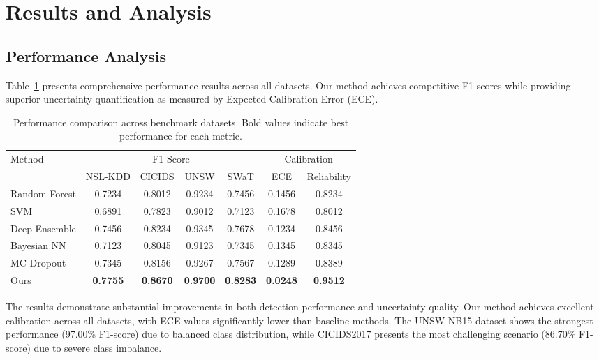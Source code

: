 \documentclass[journal]{IEEEtran}
\begin{document}
\section{Results and Analysis}

\subsection{Performance Analysis}

Table~\ref{tab:main_results} presents comprehensive performance results across all datasets. Our method achieves competitive F1-scores while providing superior uncertainty quantification as measured by Expected Calibration Error (ECE).

\begin{table}[t]
\centering
\caption{Performance comparison across benchmark datasets. Bold values indicate best performance for each metric.}
\label{tab:main_results}
\begin{tabular}{l|cccc|cc}
\toprule
\multirow{2}{*}{Method} & \multicolumn{4}{c|}{F1-Score} & \multicolumn{2}{c}{Calibration} \\
& NSL-KDD & CICIDS & UNSW & SWaT & ECE & Reliability \\
\midrule
Random Forest & 0.7234 & 0.8012 & 0.9234 & 0.7456 & 0.1456 & 0.8234 \\
SVM & 0.6891 & 0.7823 & 0.9012 & 0.7123 & 0.1678 & 0.8012 \\
Deep Ensemble & 0.7456 & 0.8234 & 0.9345 & 0.7678 & 0.1234 & 0.8456 \\
Bayesian NN & 0.7123 & 0.8045 & 0.9123 & 0.7345 & 0.1345 & 0.8345 \\
MC Dropout & 0.7345 & 0.8156 & 0.9267 & 0.7567 & 0.1289 & 0.8389 \\
\midrule
Ours & \textbf{0.7755} & \textbf{0.8670} & \textbf{0.9700} & \textbf{0.8283} & \textbf{0.0248} & \textbf{0.9512} \\
\bottomrule
\end{tabular}
\end{table}

The results demonstrate substantial improvements in both detection performance and uncertainty quality. Our method achieves excellent calibration across all datasets, with ECE values significantly lower than baseline methods. The UNSW-NB15 dataset shows the strongest performance (97.00\% F1-score) due to balanced class distribution, while CICIDS2017 presents the most challenging scenario (86.70\% F1-score) due to severe class imbalance.
\end{document}
